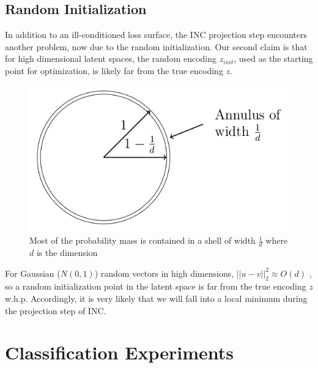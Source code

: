 \documentclass{article}
\theoremstyle{definition}
\newcommand{\norm}[2]{\left\lVert #1 \right\rVert_{#2}}
\begin{document}
\subsection{Random Initialization}

In addition to an ill-conditioned loss surface, the INC projection step encounters another problem, now due to the random initialization. Our second claim is that for high dimensional latent spaces, the random encoding $z_{init}$, used as the starting point for optimization, is likely far from the true encoding $z$.

\begin{figure}[H]
    \centering
    \includegraphics[scale=0.3]{./shell.png}
    \caption{Most of the probability mass is contained in a shell of width $\frac{1}{d}$ where $d$ is the dimension}
\end{figure}

For Gaussian ($N(0, 1)$) random vectors in high dimensions, $||u - v||_2^2 \approx O(d)$ \cite{foundations}, so a random initialization point in the latent space is far from the true encoding $z$ w.h.p. Accordingly, it is very likely that we will fall into a local minimum during the projection step of INC.

\section{Classification Experiments}
\end{document}

